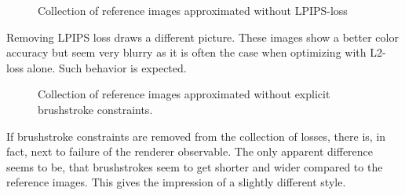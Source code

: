 \begin{figure}[!htb]
    \caption{Collection of reference images approximated without LPIPS-loss}
\end{figure}
Removing LPIPS loss draws a different picture.
These images show a better color accuracy but seem very blurry as it is often the case when optimizing with L2-loss alone.
Such behavior is expected.

\begin{figure}[!htb]
    \caption{Collection of reference images approximated without explicit brushstroke constraints.}
\end{figure}
If brushstroke constraints are removed from the collection of losses, there is, in fact, next to failure of the renderer observable.
The only apparent difference seems to be, that brushstrokes seem to get shorter and wider compared to the reference images.
This gives the impression of a slightly different style.


